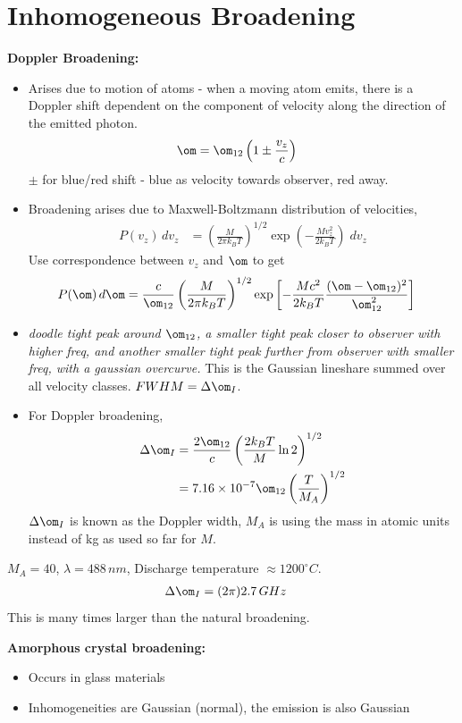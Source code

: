 \documentclass[a4paper, 11pt, normalem]{report}
\begin{document}
\section{Inhomogeneous Broadening}
\textbf{Doppler Broadening:}
\begin{itemize}
    \item Arises due to motion of atoms - when a moving atom emits, there is a Doppler shift dependent on the component of velocity along the direction of the emitted photon.
        \begin{align}
            \om &= \om_{12}\left(1 \pm \frac{v_z}{c}\right)
        \end{align} 
        $\pm$ for blue/red shift - blue as velocity towards observer, red away. 
    \item Broadening arises due to Maxwell-Boltzmann distribution of velocities,
        \begin{align}
            P(v_z)\,dv_z &= \left(\frac{M}{2\pi k_BT}\right)^{1/2} \exp\left(-\frac{Mv_z^2}{2k_BT}\right)\;dv_z
        \end{align}
        Use correspondence between $v_z$ and $\om$ to get
        \begin{align}
            P(\om)\,d\om &= \frac{c}{\om_{12}}\left(\frac{M}{2\pi k_BT}\right)^{1/2}\exp\left[-\frac{Mc^2}{2k_B T}\frac{(\om-\om_{12})^2}{\om_{12}^2}\right]
        \end{align}
    \item \textit{doodle tight peak around $\om_{12}$, a smaller tight peak closer to observer with higher freq, and another smaller tight peak further from observer with smaller freq, with a gaussian overcurve.} This is the Gaussian lineshare summed over all velocity classes. $FWHM = \Delta\om_I$.
    \item For Doppler broadening, 
        \begin{align}
            \Delta\om_I &= \frac{2\om_{12}}{c}\left(\frac{2k_BT}{M}\ln2\right)^{1/2} \\
                        &= 7.16\times10^{-7}\om_{12}\left(\frac{T}{M_A}\right)^{1/2}
        \end{align}
        $\Delta\om_I$ is known as the Doppler width, $M_A$ is using the mass in atomic units instead of kg as used so far for $M$.
\end{itemize}
\begin{example}
$M_A = 40$, $\lambda=488\,nm$, Discharge temperature $\approx 1200^\circ C$.
\begin{align}
    \Delta\om_I &= (2\pi) 2.7\,GHz
\end{align}
This is many times larger than the natural broadening. 
\end{example}
\textbf{Amorphous crystal broadening:}
\begin{itemize}
    \item Occurs in glass materials
    \item Inhomogeneities are Gaussian (normal), the emission is also Gaussian
\end{itemize}
\end{document}

